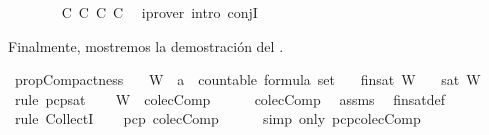 \begin{isabellebody}
\ \ \ \ \ \ \isamarkupfalse%
\ C{}\ C{}\ C{}\ C{}\ \isamarkupfalse%
\ {\isacharparenleft}iprover\ intro{\isacharcolon}\ conjI{\isacharparenright}\isanewline
\ \ \isamarkupfalse%
\isanewline
{}\isamarkupfalse%
%
\endisatagproof
{\isafoldproof}%
%
\isadelimproof
%
\endisadelimproof
%
\begin{isamarkuptext}%
Finalmente, mostremos la demostración del .%
\end{isamarkuptext}\isamarkuptrue%
\isamarkupfalse%
\ prop{\isacharunderscore}Compactness{\isacharcolon}\isanewline
\ \ \ W\ {\isacharcolon}{\isacharcolon}\ {\isachardoublequoteopen}{\isacharprime}a\ {\isacharcolon}{\isacharcolon}\ countable\ formula\ set{\isachardoublequoteclose}\isanewline
\ \ \ {\isachardoublequoteopen}fin{\isacharunderscore}sat\ W{\isachardoublequoteclose}\isanewline
\ \ \ {\isachardoublequoteopen}sat\ W{\isachardoublequoteclose}\isanewline
%
\isadelimproof
%
\endisadelimproof
%
\isatagproof
{}\isamarkupfalse%
\ {\isacharparenleft}rule\ pcp{\isacharunderscore}sat{\isacharparenright}\isanewline
\ \ \isamarkupfalse%
\ {\isachardoublequoteopen}W\ {\isasymin}\ colecComp{\isachardoublequoteclose}\isanewline
\ \ \ \ \isamarkupfalse%
\ colecComp\ \isamarkupfalse%
\ assms\ \isamarkupfalse%
\ fin{\isacharunderscore}sat{\isacharunderscore}def\ \isamarkupfalse%
\ {\isacharparenleft}rule\ CollectI{\isacharparenright}\isanewline
\ \ \isamarkupfalse%
\ {\isachardoublequoteopen}pcp\ colecComp{\isachardoublequoteclose}\isanewline
\ \ \ \ \isamarkupfalse%
\ {\isacharparenleft}simp\ only{\isacharcolon}\ pcp{\isacharunderscore}colecComp{\isacharparenright}\isanewline
{}\isamarkupfalse%
\isanewline
%
\endisatagproof
{\isafoldproof}%
%
\isadelimproof
%
\endisadelimproof
%
\isadelimtheory
%
\endisadelimtheory
%
\isatagtheory
%
\endisatagtheory
{\isafoldtheory}%
%
\isadelimtheory
%
\endisadelimtheory
%
\end{isabellebody}%
\endinput

